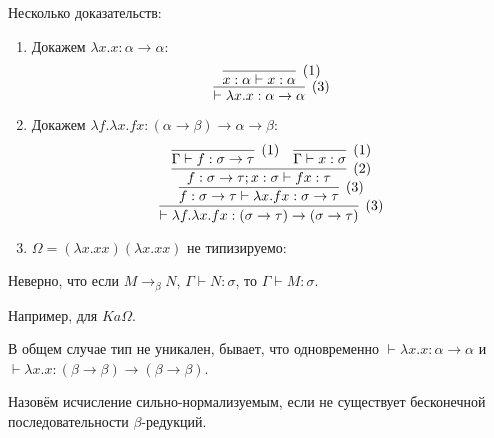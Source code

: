 \begin{example} Несколько доказательств:
    \begin{enumerate}
        \item Докажем $\lambda x . x : \alpha \rightarrow \alpha$:
        \[
            \infer[(3)]
                {\vdash \lambda x . x : \alpha \rightarrow \alpha}
                { \infer[(1)]
                    {x : \alpha \vdash x : \alpha}
                    {}
                }
        \]

        \item Докажем $\lambda f . \lambda x . f x : (\alpha \rightarrow \beta) \rightarrow \alpha \rightarrow \beta$:
        \[
            \infer[(3)]
                { \vdash \lambda f . \lambda x . f x : (\sigma \rightarrow \tau) \rightarrow (\sigma \rightarrow \tau) }
                { \infer[(3)]
                    { f : \sigma \rightarrow \tau \vdash \lambda x . f x : \sigma \rightarrow \tau }
                    { \infer[(2)]
                        {f : \sigma \rightarrow \tau; x : \sigma \vdash f x : \tau}
                        {
                            \infer[(1)]{ \Gamma \vdash f : \sigma \rightarrow \tau }{} &
                            \infer[(1)]{ \Gamma \vdash x : \sigma }{}
                        }
                    }
                }
        \]

        \item $\Omega = (\lambda x . x x) (\lambda x . x x)$ не типизируемо:
            \todo %
    \end{enumerate}
\end{example}

\begin{lemma}
    Неверно, что если $M \rightarrow_{\beta} N$, $\Gamma \vdash N : \sigma$, то $\Gamma \vdash M : \sigma$.
\end{lemma}
Например, для $Ka\Omega$.

\begin{property}
    В общем случае тип не уникален, бывает, что одновременно $\vdash \lambda x . x : \alpha \rightarrow \alpha$ и $\vdash \lambda x . x : (\beta \rightarrow \beta) \rightarrow (\beta \rightarrow \beta)$.
\end{property}

\begin{definition}
    Назовём исчисление сильно-нормализуемым, если не существует бесконечной последовательности $\beta$-редукций.
\end{definition}

